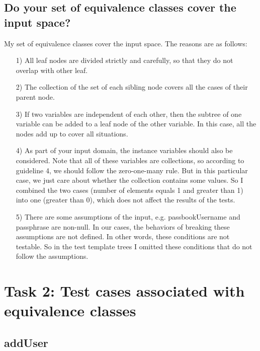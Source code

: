 \documentclass{article}
\begin{document}
\subsection{Do your set of equivalence classes cover the input space?}
My set of equivalence classes cover the input space. The reasons are as follows:
\begin{itemize}
\item [1)] All leaf nodes are divided strictly and carefully, so that they do not overlap with other leaf.
\item [2)] The collection of the set of each sibling node covers all the cases of their parent node.
\item [3)]
If two variables are independent of each other, then the subtree of one variable can be added to a leaf node of the other variable. In this case, all the nodes add up to cover all situations.
\item [4)]
As part of your input domain, the instance variables should also be considered. Note that all of these variables are collections, so according to guideline 4, we should follow the zero-one-many rule. But in this particular case, we just care about whether the collection contains some values. So I combined the two cases (number of elements equals 1 and greater than 1) into one (greater than 0), which does not affect the results of the tests.
\item [5)]
There are some assumptions of the input, e.g. passbookUsername and passphrase are non-null. In our cases, the behaviors of breaking these assumptions are not defined. In other words, these conditions are not testable. So in the test template trees I omitted these conditions that do not follow the assumptions.
\end{itemize}

\section{Task 2: Test cases associated with equivalence classes}
\subsection{addUser}
\end{document}
